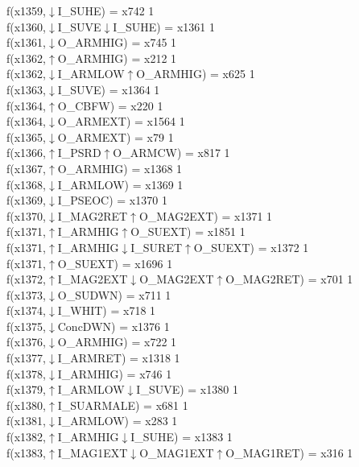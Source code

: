 f(x1359,$\downarrow$I\_SUHE) = x742 {1} \\
f(x1360,$\downarrow$I\_SUVE$\downarrow$I\_SUHE) = x1361 {1} \\
f(x1361,$\downarrow$O\_ARMHIG) = x745 {1} \\
f(x1362,$\uparrow$O\_ARMHIG) = x212 {1} \\
f(x1362,$\downarrow$I\_ARMLOW$\uparrow$O\_ARMHIG) = x625 {1} \\
f(x1363,$\downarrow$I\_SUVE) = x1364 {1} \\
f(x1364,$\uparrow$O\_CBFW) = x220 {1} \\
f(x1364,$\downarrow$O\_ARMEXT) = x1564 {1} \\
f(x1365,$\downarrow$O\_ARMEXT) = x79 {1} \\
f(x1366,$\uparrow$I\_PSRD$\uparrow$O\_ARMCW) = x817 {1} \\
f(x1367,$\uparrow$O\_ARMHIG) = x1368 {1} \\
f(x1368,$\downarrow$I\_ARMLOW) = x1369 {1} \\
f(x1369,$\downarrow$I\_PSEOC) = x1370 {1} \\
f(x1370,$\downarrow$I\_MAG2RET$\uparrow$O\_MAG2EXT) = x1371 {1} \\
f(x1371,$\uparrow$I\_ARMHIG$\uparrow$O\_SUEXT) = x1851 {1} \\
f(x1371,$\uparrow$I\_ARMHIG$\downarrow$I\_SURET$\uparrow$O\_SUEXT) = x1372 {1} \\
f(x1371,$\uparrow$O\_SUEXT) = x1696 {1} \\
f(x1372,$\uparrow$I\_MAG2EXT$\downarrow$O\_MAG2EXT$\uparrow$O\_MAG2RET) = x701 {1} \\
f(x1373,$\downarrow$O\_SUDWN) = x711 {1} \\
f(x1374,$\downarrow$I\_WHIT) = x718 {1} \\
f(x1375,$\downarrow$ConcDWN) = x1376 {1} \\
f(x1376,$\downarrow$O\_ARMHIG) = x722 {1} \\
f(x1377,$\downarrow$I\_ARMRET) = x1318 {1} \\
f(x1378,$\downarrow$I\_ARMHIG) = x746 {1} \\
f(x1379,$\uparrow$I\_ARMLOW$\downarrow$I\_SUVE) = x1380 {1} \\
f(x1380,$\uparrow$I\_SUARMALE) = x681 {1} \\
f(x1381,$\downarrow$I\_ARMLOW) = x283 {1} \\
f(x1382,$\uparrow$I\_ARMHIG$\downarrow$I\_SUHE) = x1383 {1} \\
f(x1383,$\uparrow$I\_MAG1EXT$\downarrow$O\_MAG1EXT$\uparrow$O\_MAG1RET) = x316 {1} \\

